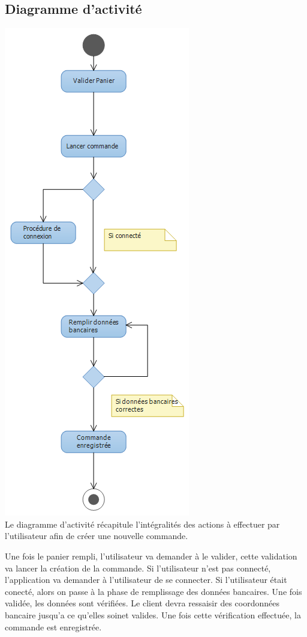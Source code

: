 \subsection{Diagramme d'activité}
\includegraphics[scale=0.5]{Res/activityCommande.png}\\
Le diagramme d'activité récapitule l'intégralités des actions à effectuer par l'utilisateur afin de créer une nouvelle commande.

Une fois le panier rempli, l'utilisateur va demander à le valider, cette validation va lancer la création de la commande. Si l'utilisateur n'est pas connecté, l'application va demander à l'utilisateur de se connecter.
Si l'utilisateur était conecté, alors on passe à la phase de remplissage des données bancaires. Une fois validée, les données sont vérifiées. Le client devra ressaisir des coordonnées bancaire jusqu'a ce qu'elles soinet valides.
Une fois cette vérification effectuée, la commande est enregistrée.
\clearpage

